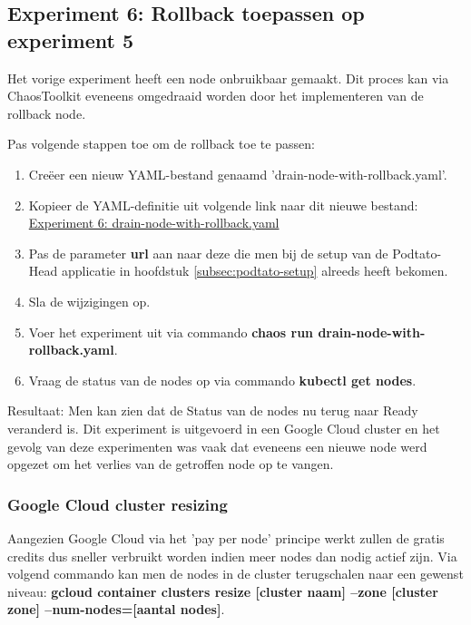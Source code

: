 \subsection{Experiment 6: Rollback toepassen op experiment 5}

Het vorige experiment heeft een node onbruikbaar gemaakt. Dit proces kan via ChaosToolkit eveneens omgedraaid worden door het implementeren van de rollback {\uncordon\textunderscore node}. \autocite{Chaostoolkit2022f}

Pas volgende stappen toe om de rollback toe te passen:
\begin{enumerate}
    \item Creëer een nieuw YAML-bestand genaamd 'drain-node-with-rollback.yaml'.
    \item Kopieer de YAML-definitie uit volgende link naar dit nieuwe bestand: \href{https://github.com/KenBruggeman/BP\textunderscore 21-22/blob/master/bachelorproef/docs/chaostoolkit%20experimenten/drain-node-with-rollback.yaml}{Experiment 6: drain-node-with-rollback.yaml}
    \item Pas de parameter {\bf url} aan naar deze die men bij de setup van de Podtato-Head applicatie in hoofdstuk \ref{subsec:podtato-setup} alreeds heeft bekomen.
    \item Sla de wijzigingen op.
    \item Voer het experiment uit via commando {\bf chaos run drain-node-with-rollback.yaml}. 
    \item Vraag de status van de nodes op via commando {\bf kubectl get nodes}.
\end{enumerate}

Resultaat: Men kan zien dat de Status van de nodes nu terug naar Ready veranderd is. Dit experiment is uitgevoerd in een Google Cloud cluster en het gevolg van deze experimenten was vaak dat eveneens een nieuwe node werd opgezet om het verlies van de getroffen node op te vangen. 

\subsubsection{Google Cloud cluster resizing}

Aangezien Google Cloud via het 'pay per node' principe werkt zullen de gratis credits dus sneller
verbruikt worden indien meer nodes dan nodig actief zijn. Via volgend commando kan men de nodes in
de cluster terugschalen naar een gewenst niveau: {\bf gcloud container clusters resize [cluster naam] --zone [cluster zone] --num-nodes=[aantal nodes]}. 

